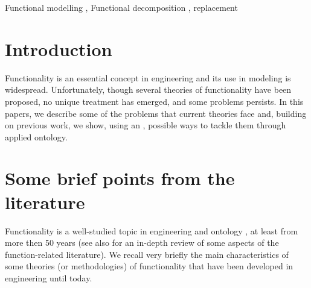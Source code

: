 \documentclass[
]{ceurart}
\begin{document}
\begin{keywords}
  Functional modelling \sep
  Functional decomposition \sep
  replacement %
\end{keywords}

\maketitle


\section{Introduction}
    
Functionality is an essential concept in engineering and its use in modeling is widespread. 
Unfortunately, though several theories of functionality have been proposed, no unique treatment has emerged, and some problems persists.
In this papers, we describe some of the problems that current theories face and, building on previous work, we show, using an , possible ways to tackle them through applied ontology. 

\section{Some brief points from the literature}\label{sec:literature}

Functionality is a well-studied topic in engineering \cite{chandrasekaranFunctionalRepresentationDesign1993, umedaFunctionBehaviourStructure1990, hirtz_functional_2002} and ontology \cite{sasajimaFBRLFunctionBehavior1995, TowardAUnifiedDefinition2012}, at least from more then 50 years \cite{collinsFailureExperienceMatrixUseful1976,pahl_engineering_2007} (see also \cite{erdenReviewFunctionModeling2008} for an in-depth review of some aspects of the function-related literature).
We recall very briefly the main characteristics of some theories (or methodologies) of functionality that have been developed in engineering until today.
\end{document}
